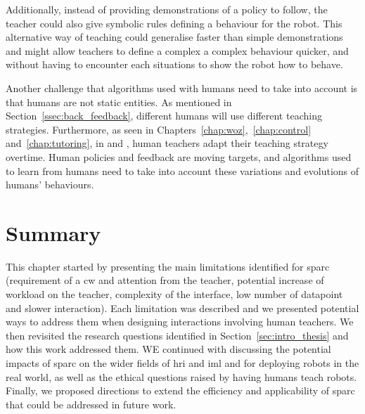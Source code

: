 Additionally, instead of providing demonstrations of a policy to follow, the teacher could also give symbolic rules defining a behaviour for the robot. This alternative way of teaching could generalise faster than simple demonstrations and might allow teachers to define a complex a complex behaviour quicker, and without having to encounter each situations to show the robot how to behave.

Another challenge that algorithms used with humans need to take into account is that humans are not static entities. As mentioned in Section~\ref{ssec:back_feedback}, different humans will use different teaching strategies. Furthermore, as seen in Chapters~\ref{chap:woz},~\ref{chap:control} and~\ref{chap:tutoring}, in \cite{thomaz2008teachable} and \cite{macglashan2017interactive}, human teachers adapt their teaching strategy overtime. Human policies and feedback are moving targets, and algorithms used to learn from humans need to take into account these variations and evolutions of humans' behaviours.

\section{Summary} \label{sec:disc_summary}


This chapter started by presenting the main limitations identified for \gls{sparc} (requirement of a \gls{cw} and attention from the teacher, potential increase of workload on the teacher, complexity of the interface, low number of datapoint and slower interaction). Each limitation was described and we presented potential ways to address them when designing interactions involving human teachers. We then revisited the research questions identified in Section~\ref{sec:intro_thesis} and how this work addressed them. WE continued with discussing the potential impacts of \gls{sparc} on the wider fields of \gls{hri} and \gls{iml} and for deploying robots in the real world, as well as the ethical questions raised by having humans teach robots. Finally, we proposed directions to extend the efficiency and applicability of \gls{sparc} that could be addressed in future work.
